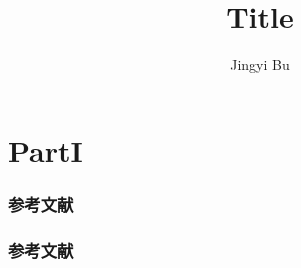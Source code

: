 \documentclass[twoside,CJK,openany,UTF8,fancyhdr]{ctexbook}%
\begin{document}
\renewcommand{\contentsname}{目录}     %
\renewcommand{\abstractname}{摘要}     %
\renewcommand{\refname}{参考文献}      %
\renewcommand{\indexname}{索引}
\renewcommand{\figurename}{图}
\renewcommand{\tablename}{表}
\renewcommand{\appendixname}{附录}
\renewcommand{\proofname}{证明}





\author{Jingyi Bu}
\title{Title}

\maketitle

\setlength{\parskip}{0.25 \baselineskip}
\newlength{\figwidth}
\setlength{\figwidth}{26pc}
\newlength{\notationgap}
\setlength{\notationgap}{1pc}

\graphicspath{
{chapter00/}
{chapter01/}
{chapter02/}
{chapter03/}
{chapter04/}
{chapter05/}
{chapter06/}
{chapter07/}
{chapter08/}
{chapter09/}
}













%


\tableofcontents
\newpage
\part{PartI}
\newpage




\section*{参考文献}\printbibliography[segment=\therefsegment,heading=none]


\newpage
\section*{参考文献}\printbibliography[segment=\therefsegment,heading=none]
\end{document}
